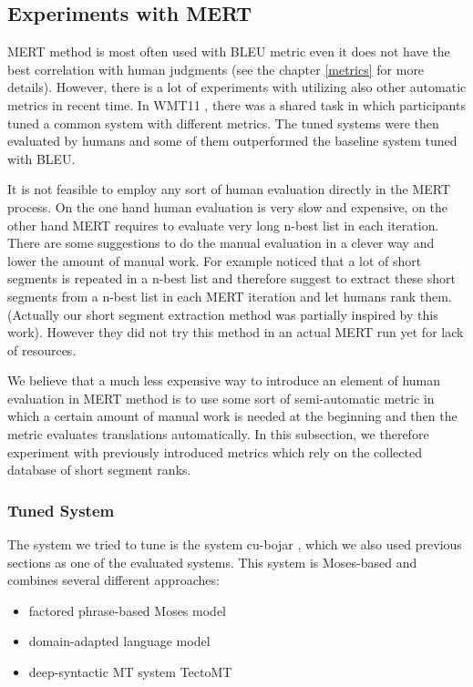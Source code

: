\subsection{Experiments with MERT}

MERT method is most often used with BLEU metric even it does not have the best
correlation with human judgments (see the chapter \ref{metrics} for more
details). However, there is a lot of experiments with utilizing also other
automatic metrics in recent time. In WMT11 , there was a shared
task in which participants tuned a common system with different metrics. The
tuned systems were then evaluated by humans and some of them outperformed the
baseline system tuned with BLEU.

It is not feasible to employ any sort of human evaluation directly in the MERT
process. On the one hand human evaluation is very slow and expensive, on the
other hand MERT requires to evaluate very long n-best list in each iteration.
There are some suggestions to do the manual evaluation in a clever way and
lower the amount of manual work. For example 
noticed that a lot of short segments is repeated in a n-best list and therefore
suggest to extract these short segments from a n-best list in each MERT
iteration and let humans rank them. (Actually our short segment extraction
method was partially inspired by this work). However they did not try this
method in an actual MERT run yet for lack of resources. 

We believe that a much less expensive way to introduce an element of human
evaluation in MERT method is to use some sort of semi-automatic metric in which
a certain amount of manual work is needed at the beginning and then the metric
evaluates translations automatically. In this subsection, we therefore
experiment with previously introduced metrics which rely on the collected
database of short segment ranks.

\subsubsection{Tuned System}

The system we tried to tune is the system cu-bojar ,
which we also used previous sections as one of the evaluated systems. This
system is Moses-based and combines several different approaches:

\begin{itemize}
  \item factored phrase-based Moses model
  \item domain-adapted language model
  \item deep-syntactic MT system TectoMT
\end{itemize}


